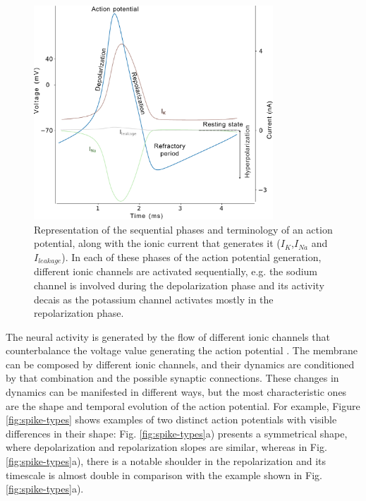 \begin{figure}[htb!]
    \centering
    \includegraphics[width=0.8\textwidth]{img/intro/action_potential.pdf}
    \caption{Representation of the sequential phases and terminology of an action potential, along with the ionic current that generates it ($I_K$,$I_{Na}$ and $I_{leakage}$). In each of these phases of the action potential generation, different ionic channels are activated sequentially, e.g. the sodium channel is involved during the depolarization phase and its activity decais as the potassium channel activates mostly in the repolarization phase. }
    \label{fig:action potential}
\end{figure}

The neural activity is generated by the flow of different ionic channels that counterbalance the voltage value generating the action potential \parencite{koch_biophysics_1999}. The membrane can be composed by different ionic channels, and their dynamics are conditioned by that combination and the possible synaptic connections. These changes in dynamics can be manifested in different ways, but the most characteristic ones are the shape and temporal evolution of the action potential. %
For example, Figure \ref{fig:spike-types} shows examples of two distinct action potentials with visible differences in their shape: Fig. \ref{fig:spike-types}a) presents a symmetrical shape, where depolarization and repolarization slopes are similar, whereas in Fig. \ref{fig:spike-types}a), there is a notable shoulder in the repolarization and its timescale is almost double in comparison with the example shown in Fig.\ref{fig:spike-types}a).

